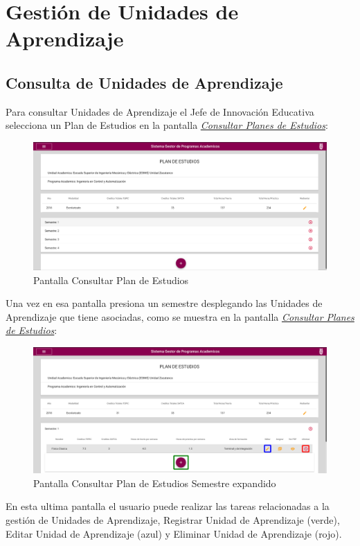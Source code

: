 \section{Gestión de Unidades de Aprendizaje}
    \subsection{Consulta de Unidades de Aprendizaje}
Para consultar Unidades de Aprendizaje el Jefe de Innovación Educativa selecciona un Plan de Estudios en la pantalla \hyperlink{consultarS}{\textit{Consultar Planes de Estudios}}:\\
\begin{figure}[H]
    \centering
    \hypertarget{consultarS}{\includegraphics[width=0.7\linewidth]{images/GUA/consultarS}}
    \caption{Pantalla Consultar Plan de Estudios}
    \label{consultarS}
\end{figure}
\newpage
Una vez en esa pantalla presiona un semestre desplegando las Unidades de Aprendizaje que tiene asociadas, como se muestra en la pantalla \hyperlink{consultarUA}{\textit{Consultar Planes de Estudios}}:\\
\begin{figure}[H]
    \centering
    \hypertarget{consultarUA}{\includegraphics[width=0.7\linewidth]{images/GUA/consultarUA}}
    \caption{Pantalla Consultar Plan de Estudios Semestre expandido}
    \label{consultarUA}
\end{figure}
En esta ultima pantalla el usuario puede realizar las tareas relacionadas a la gestión de Unidades de Aprendizaje, Registrar Unidad de Aprendizaje (verde), Editar Unidad de Aprendizaje (azul) y Eliminar Unidad de Aprendizaje (rojo).
\newpage
